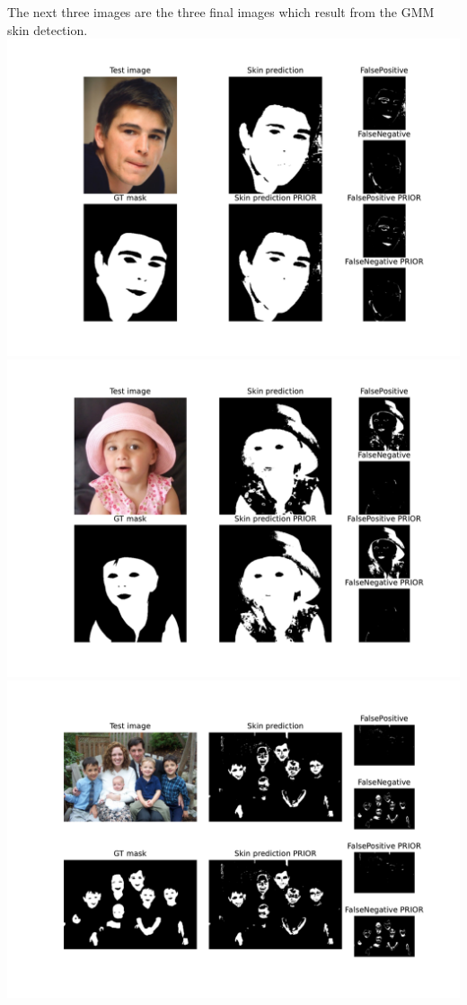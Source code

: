 \documentclass[11pt]{article}
\begin{document}
\begin{enumerate}[1.]
\begin{verbatim}
	\end{verbatim}

The next three images are the three final images which result from the GMM skin detection.\\

	\includegraphics[width=6in]{Training-GMM.pdf}\\
	
	\includegraphics[width=6in]{Test-portrait-GMM.pdf}\\

	\includegraphics[width=6in]{Test-family-GMM.pdf}\\


\end{enumerate}
\end{document}
